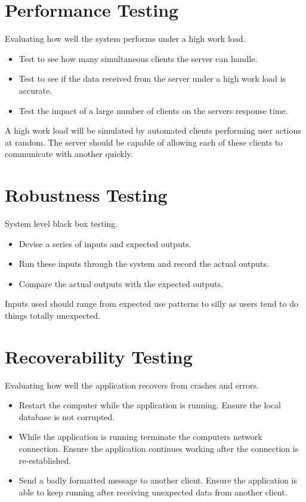 \section{Performance Testing}
Evaluating how well the system performs under a high work load.
\begin{itemize}
\item Test to see how many simultaneous clients the server can handle.
\item Test to see if the data received from the server under a high work load is 
accurate.
\item Test the impact of a large number of clients on the servers response time.
\end{itemize}
A high work load will be simulated by automated clients performing user actions
at random. The server should be capable of allowing each of these clients to
communicate with another quickly.

\section{Robustness Testing}
System level black box testing.  
\begin{itemize}
\item Devise a series of inputs and expected outputs.
\item Run these inputs through the system and record the actual outputs.
\item Compare the actual outputs with the expected outputs.
\end{itemize}
Inputs used should range from expected use patterns to silly as users tend to do 
things totally unexpected.

\section{Recoverability Testing}
Evaluating how well the application recovers from crashes and errors.
\begin{itemize}
\item Restart the computer while the application is running.
Ensure the local database is not corrupted.
\item While the application is running terminate the computers network 
connection. Ensure the application continues working after the connection is
re-established.
\item Send a badly formatted message to another client. Ensure the application 
is able to keep running after receiving unexpected data from another client.
\end{itemize}

